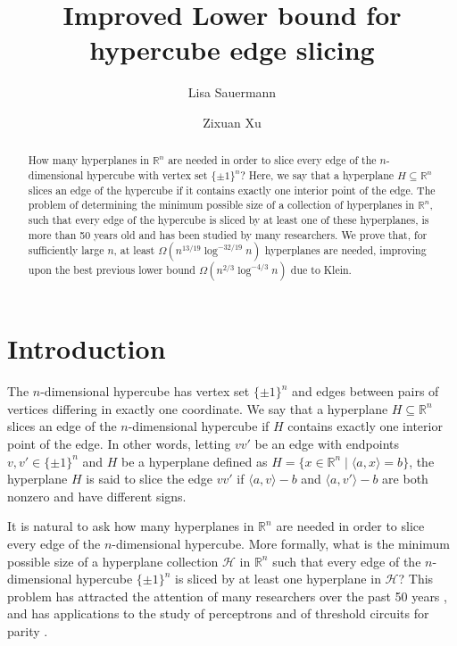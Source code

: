 \documentclass[reqno]{amsart}
\title
{Improved Lower bound for hypercube edge slicing}
\author{Lisa Sauermann}
\author{Zixuan Xu}
\theoremstyle{remark}
\theoremstyle{definition}
\numberwithin{theorem}{section}
\renewcommand{\(}{\bigl(}
\renewcommand{\)}{\bigr)\vphantom{)}}
\newcommand{\cH}{\mathcal H}
\newcommand{\R}{\mathbb R}
\newcommand{\ang}[1]{\langle#1\rangle}
\newcommand{\bin}{\{\pm 1\}}
\begin{document}
\begin{abstract}
How many hyperplanes in $\R^n$ are needed in order to slice every edge of the $n$-dimensional hypercube with vertex set $\{\pm 1\}^n$? Here, we say that a hyperplane $H\subseteq \R^n$ slices an edge of the hypercube if it contains exactly one interior point of the edge. The problem of determining the minimum possible size of a collection of hyperplanes in $\R^n$, such that every edge of the hypercube is sliced by at least one of these hyperplanes, is more than 50 years old and has been studied by many researchers. We prove that, for sufficiently large $n$, at least $\Omega(n^{13/19}\log^{-32/19}n)$ hyperplanes are needed, improving upon the best previous lower bound $\Omega(n^{2/3}\log^{-4/3}n)$ due to Klein.
\end{abstract}
		
\maketitle


\vspace{-2em}

\section{Introduction}


The $n$-dimensional hypercube has vertex set $\bin^n$ and edges between pairs of vertices differing in exactly one coordinate.
We say that a hyperplane $H\subseteq \R^n$ slices an edge of the $n$-dimensional hypercube if $H$ contains exactly one interior point of the edge. In other words, letting $vv'$ be an edge with endpoints $v,v'\in \bin^n$ and $H$ be a hyperplane defined as $H = \{x\in \R^n\mid \ang{a,x} = b \}$, the hyperplane $H$ is said to slice the edge $vv'$ if $\ang{a,v} - b$ and $\ang{a,v'} - b$ are both nonzero and have different signs.


It is natural to ask how many hyperplanes in $\R^n$ are needed in order to slice every edge of the $n$-dimensional hypercube. More formally, what is the minimum possible size of a hyperplane collection $\cH$ in $\R^n$ such that every edge of the $n$-dimensional hypercube $\bin^n$ is sliced by at least one hyperplane in $\cH$? This problem has attracted the attention of many researchers over the past 50 years \cite{ONeil71, grunbaum72, EmamyKhansary86,AHLSWEDE1990137,saks1993,GotsmanLinial94}, and has applications to the study of perceptrons \cite{ONeil71} and of threshold circuits for parity \cite{paturi1990threshold,yehuda2021slicing}. 
\end{document}
